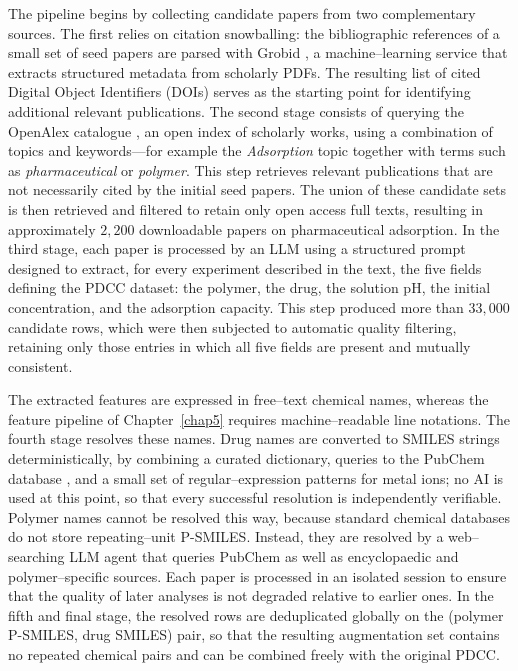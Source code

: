 The pipeline begins by collecting candidate papers from two complementary sources. The first relies on citation snowballing: the bibliographic references of a small set of seed papers are parsed with Grobid \cite{grobid}, a machine--learning service that extracts structured metadata from scholarly PDFs. The resulting list of cited Digital Object Identifiers (DOIs) serves as the starting point for identifying additional relevant publications. The second stage consists of querying the OpenAlex catalogue \cite{openalex}, an open index of scholarly works, using a combination of topics and keywords—for example the \emph{Adsorption} topic together with terms such as \emph{pharmaceutical} or \emph{polymer}. This step retrieves relevant publications that are not necessarily cited by the initial seed papers. The union of these candidate sets is then retrieved and filtered to retain only open access full texts, resulting in approximately $2{,}200$ downloadable papers on pharmaceutical adsorption. In the third stage, each paper is processed by an LLM using a structured prompt designed to extract, for every experiment described in the text, the five fields defining the PDCC dataset: the polymer, the drug, the solution pH, the initial concentration, and the adsorption capacity. This step produced more than $33{,}000$ candidate rows, which were then subjected to automatic quality filtering, retaining only those entries in which all five fields are present and mutually consistent.

The extracted features are expressed in free--text chemical names, whereas the feature pipeline of Chapter~\ref{chap5} requires machine--readable line notations. The fourth stage resolves these names. Drug names are converted to SMILES strings deterministically, by combining a curated dictionary, queries to the PubChem database \cite{pubchem}, and a small set of regular--expression patterns for metal ions; no AI is used at this point, so that every successful resolution is independently verifiable. Polymer names cannot be resolved this way, because standard chemical databases do not store repeating--unit P-SMILES. Instead, they are resolved by a web--searching LLM agent that queries PubChem as well as encyclopaedic and polymer--specific sources. Each paper is processed in an isolated session to ensure that the quality of later analyses is not degraded relative to earlier ones. In the fifth and final stage, the resolved rows are deduplicated globally on the (polymer P-SMILES, drug SMILES) pair, so that the resulting augmentation set contains no repeated chemical pairs and can be combined freely with the original PDCC.

